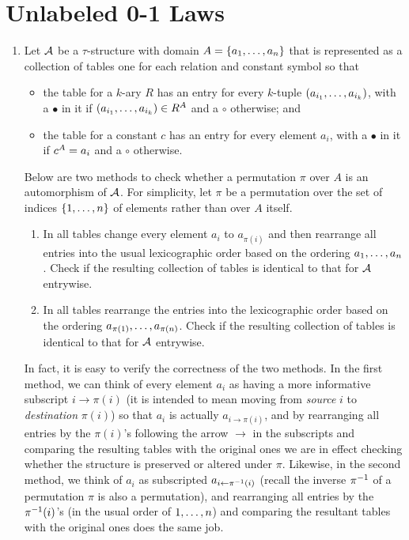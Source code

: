 \section{Unlabeled 0-1 Laws}
\begin{enumerate}[1.]
%
\item {} Let $\mathcal{A}$ be a $\tau$-structure with domain $A = {\{a_1, \ldots, a_n\}}$ that is represented as a collection of tables one for each relation and constant symbol so that
\begin{itemize}
\item the table for a $k$-ary $R$ has an entry for every $k$-tuple $(a_{i_1}, \ldots, a_{i_k})$, with a $\bullet$ in it if $(a_{i_1}, \ldots, a_{i_k}) \in R^{A}$ and a $\circ$ otherwise; and
\item the table for a constant $c$ has an entry for every element $a_i$, with a $\bullet$ in it if $c^{A} = a_i$ and a $\circ$ otherwise.
\end{itemize}
Below are two methods to check whether a permutation $\pi$ over $A$ is an automorphism of $\mathcal{A}$. For simplicity, let $\pi$ be a permutation over the set of indices ${\{1, \ldots, n\}}$ of elements rather than over $A$ itself.
\begin{enumerate}[(1)]
\item In all tables change every element $a_i$ to $a_{\pi(i)}$ and then rearrange all entries into the usual lexicographic order based on the ordering $a_1, \ldots, a_n$. Check if the resulting collection of tables is identical to that for $\mathcal{A}$ entrywise.
\item In all tables rearrange the entries into the lexicographic order based on the ordering $a_{\pi(1)}, \ldots, a_{\pi(n)}$. Check if the resulting collection of tables is identical to that for $\mathcal{A}$ entrywise.
\end{enumerate}
In fact, it is easy to verify the correctness of the two methods. In the first method, we can think of every element $a_i$ as having a more informative subscript $i \to \pi(i)$ (it is intended to mean moving from \emph{source} $i$ to \emph{destination} $\pi(i)$) so that $a_i$ is actually $a_{i \to \pi(i)}$, and by rearranging all entries by the $\pi(i)$'s following the arrow $\to$ in the subscripts and comparing the resulting tables with the original ones we are in effect checking whether the structure is preserved or altered under $\pi$. Likewise, in the second method, we think of $a_i$ as subscripted $a_{i \leftarrow \pi^{-1}(i)}$ (recall the inverse $\pi^{-1}$ of a permutation $\pi$ is also a permutation), and rearranging all entries by the $\pi^{-1}(i)$'s (in the usual order of $1, \ldots, n$) and comparing the resultant tables with the original ones does the same job.
%
\end{enumerate}


